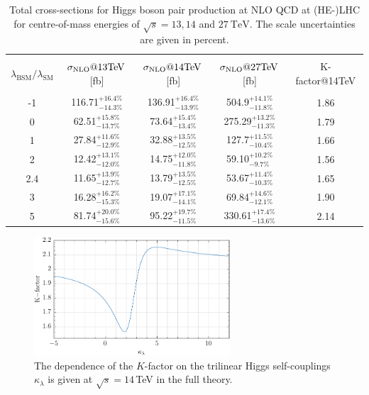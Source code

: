 \documentclass[a4paper]{jpconf}
\newcommand{\TeV}{\ensuremath{\mathrm{\:TeV}}}
\newcommand{\chhh}{\ensuremath{\kappa_{\lambda}}}
\begin{document}
\begin{table}[htb!]
\begin{center}
\begin{tabular}{| c | c | c |c|c|}
\hline
&&&&\\
$\lambda_{\mathrm{BSM}}/\lambda_{\mathrm{SM}}$ & $\sigma_{\rm{NLO}}@13 \mathrm{TeV}$\,[fb]& $\sigma_{\rm{NLO}}@14 \mathrm{TeV}$\,[fb] & $\sigma_{\rm{NLO}}@27 \mathrm{TeV}$\,[fb] &K-factor@14TeV\\
&&&&\\
\hline
-1& 116.71$^{+16.4\%}_{-14.3\%}$  & 136.91$^{+16.4\%}_{-13.9\%}$& 504.9$^{+14.1\%}_{-11.8\%}$ & 1.86 \\
\hline
0& 62.51$^{+15.8\%}_{-13.7\%}$ & 73.64$^{+15.4\%}_{-13.4\%}$& 275.29$^{+13.2\%}_{-11.3\%}$& 1.79  \\
\hline 
1& 27.84$^{+11.6\%}_{-12.9\%}$ & 32.88$^{+13.5\%}_{-12.5\%}$&127.7$^{+11.5\%}_{-10.4\%}$ &1.66\\
\hline
2 & 12.42$^{+13.1\%}_{-12.0\%}$ & 14.75$^{+12.0\%}_{-11.8\%}$ &  59.10$^{+10.2\%}_{-9.7\%}$ & 1.56 \\
\hline
2.4& 11.65$^{+13.9\%}_{-12.7\%}$ & 13.79$^{+13.5\%}_{-12.5\%}$& 53.67$^{+11.4\%}_{-10.3\%}$ & 1.65 \\
\hline
3& 16.28$^{+16.2\%}_{-15.3\%}$ & 19.07$^{+17.1\%}_{-14.1\%}$ & 69.84$^{+14.6\%}_{-12.1\%}$ & 1.90 \\
\hline 
5& 81.74$^{+20.0\%}_{-15.6\%}$  & 95.22$^{+19.7\%}_{-11.5\%}$& 330.61$^{+17.4\%}_{-13.6\%}$ & 2.14 \\
\hline 
\end{tabular}
\end{center}
\caption{Total cross-sections  for Higgs boson pair production at NLO QCD at (HE-)LHC for centre-of-mass energies of $\sqrt{s}=13,14$ and $27 \TeV$. The scale uncertainties are given in percent.
\label{tab:sigmatot}}
\end{table}

\begin{figure}[htb!]
  \centering
    \includegraphics[width=0.65\textwidth]{figures/Kfactor.pdf}
\caption{The dependence of the $K$-factor on the trilinear Higgs self-couplings $\chhh$ is given at $\sqrt{s}=14$\,TeV in the full theory.}
\label{fig:Kfacvariation}
\end{figure}
\end{document}
